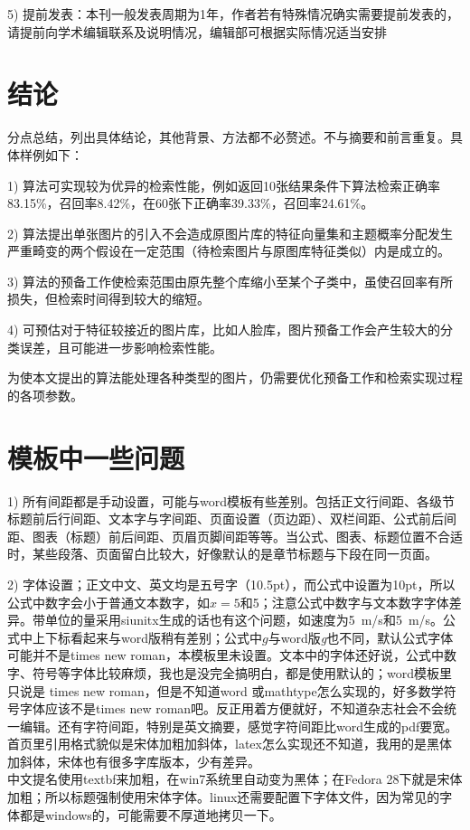 \documentclass[10.5pt,twocolumn]{aaas}
\newcommand\mycolorRed[1]{{\color{red}#1}}
\begin{document}
5) 提前发表：本刊一般发表周期为1年，作者若有特殊情况确实需要提前发表的，请提前向学术编辑联系及说明情况，编辑部可根据实际情况适当安排

\section{结\quad 论}
分点总结，列出具体结论，其他背景、方法都不必赘述。不与摘要和前言重复。具体样例如下：

1) 算法可实现较为优异的检索性能，例如返回10张结果条件下算法检索正确率83.15\%，召回率8.42\%，在60张下正确率39.33\%，召回率24.61\%。

2) 算法提出单张图片的引入不会造成原图片库的特征向量集和主题概率分配发生严重畸变的两个假设在一定范围（待检索图片与原图库特征类似）内是成立的。

3) 算法的预备工作使检索范围由原先整个库缩小至某个子类中，虽使召回率有所损失，但检索时间得到较大的缩短。

4) 可预估对于特征较接近的图片库，比如人脸库，图片预备工作会产生较大的分类误差，且可能进一步影响检索性能。

为使本文提出的算法能处理各种类型的图片，仍需要优化预备工作和检索实现过程的各项参数。


\section{\mycolorRed{模板中一些问题}}

1) 所有\mycolorRed{间距}都是手动设置，可能与word模板有些差别。包括正文行间距、各级节标题前后行间距、文本字与字间距、页面设置（页边距）、双栏间距、公式前后间距、图表（标题）前后间距、页眉页脚间距等等。当公式、图表、标题位置不合适时，某些段落、页面留白比较大，好像默认的是章节标题与下段在同一页面。

2) \mycolorRed{字体}设置；正文中文、英文均是五号字（10.5pt），而公式中设置为10pt，所以公式中数字会小于普通文本数字，如$x=5$和5；注意公式中数字与文本数字字体差异。带单位的量采用siunitx生成的话也有这个问题，如速度为\SI{5}{m/s}和5\ m/s。公式中上下标看起来与word版稍有差别；公式中$g$与word版\textit{g}也不同，默认公式字体可能并不是times new roman，本模板里未设置。文本中的字体还好说，公式中数字、符号等字体比较麻烦，我也是没完全搞明白，都是使用默认的；word模板里只说是 times new roman，但是不知道word 或mathtype怎么实现的，好多数学符号字体应该不是times new roman吧。反正用着方便就好，不知道杂志社会不会统一编辑。还有字符间距，特别是英文摘要，感觉字符间距比word生成的pdf要宽。首页里引用格式貌似是宋体加粗加斜体，latex怎么实现还不知道，我用的是黑体加斜体，宋体也有很多字库版本，少有差异。\\
中文提名使用textbf来加粗，在win7系统里自动变为黑体；在Fedora 28下就是宋体加粗；所以标题强制使用宋体字体。linux还需要配置下字体文件，因为常见的字体都是windows的，可能需要不厚道地拷贝一下。
\end{document}
